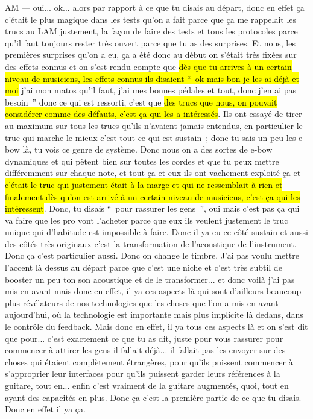 AM — oui... ok... alors par rapport à ce que tu disais au départ, donc en effet ça c'était le plus magique dans les tests qu'on a fait parce que ça me rappelait les trucs au LAM justement, la façon de faire des tests et tous les protocoles parce qu'il faut toujours rester très ouvert parce que tu as des surprises. Et nous, les premières surprises qu'on a eu, ça a été donc au début on s'était très fixées sur des effets connus et on s'est rendu compte que \hl{dès que tu arrives à un certain niveau de musiciens, les effets connus ils disaient “ ok mais bon je les ai déjà et moi} j'ai mon matos qu'il faut, j'ai mes bonnes pédales et tout, donc j'en ai pas besoin ” donc ce qui est ressorti, c'est que \hl{des trucs que nous, on pouvait considérer comme des défauts, c'est ça qui les a intéressés}. Ils ont essayé de tirer au maximum sur tous les trucs qu'ils n'avaient jamais entendus, en particulier le truc qui marche le mieux c'est tout ce qui est sustain ; donc tu sais un peu les e-bow là, tu vois ce genre de système. Donc nous on a des sortes de e-bow dynamiques et qui pètent bien sur toutes les cordes et que tu peux mettre différemment sur chaque note, et tout ça et eux ils ont vachement exploité ça et \hl{c'était le truc qui justement était à la marge et qui ne ressemblait à rien et finalement dès qu'on est arrivé à un certain niveau de musiciens, c'est ça qui les intéressent}. Donc, tu disais “ pour rassurer les gens ”, oui mais c'est pas ça qui va faire que les pro vont l'acheter parce que eux ils veulent justement le truc unique qui d'habitude est impossible à faire. Donc il ya eu ce côté sustain et aussi des côtés très originaux c'est la transformation de l'acoustique de l'instrument. Donc ça c'est particulier aussi. Donc on change le timbre. J'ai pas voulu mettre l'accent là dessus au départ parce que c'est une niche et c'est très subtil de booster un peu ton son acoustique et de le transformer... et donc voilà j'ai pas mis en avant mais donc en effet, il ya ces aspects là qui sont d'ailleurs beaucoup plus révélateurs de nos technologies que les choses que l'on a mis en avant aujourd'hui, où la technologie est importante mais plus implicite là dedans, dans le contrôle du feedback. Mais donc en effet, il ya tous ces aspects là et on s'est dit que pour... c'est exactement ce que tu as dit, juste pour vous rassurer pour commencer à attirer les gens il fallait déjà... il fallait pas les envoyer sur des choses qui étaient complètement étrangères, pour qu'ils puissent commencer à s'approprier leur interfaces pour qu'ils puissent garder leurs références à la guitare, tout en... enfin c'est vraiment de la guitare augmentés, quoi, tout en ayant des capacités en plus. Donc ça c'est la première partie de ce que tu disais. Donc en effet il ya ça. 

